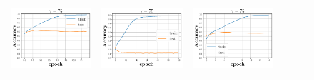 \begin{figure}[h]
\begin{minipage}{0.99\columnwidth}
{\begin{tabular}{cccccc}
\includegraphics[scale=0.125]{figs/galu_75_good.pdf}&
\includegraphics[scale=0.125]{figs/galu_75_bad.pdf}&
\includegraphics[scale=0.125]{figs/galu_75_bad_good.pdf}&

\end{tabular}}
\end{minipage}
\end{figure}
